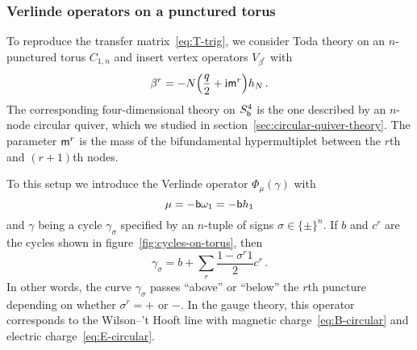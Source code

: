 \subsubsection{Verlinde operators on a punctured torus}

To reproduce the transfer matrix~\eqref{eq:T-trig}, we consider Toda
theory on an $n$-punctured torus $C_{1,n}$ and insert vertex operators
$V_{\beta^r}$ with
\begin{equation}
  \beta^r
  = -N\Bigl(\frac{q}{2} + \mathrm{i}\mathsf{m}^r\Bigr) h_N \,.
\end{equation}
The corresponding four-dimensional theory on $S^4_{\mathsf{b}}$ is the one
described by an $n$-node circular quiver, which we studied in
section~\ref{sec:circular-quiver-theory}.  The parameter $\mathsf{m}^r$ is
the mass of the bifundamental hypermultiplet between the $r$th and
$(r+1)$th nodes.

To this setup we introduce the Verlinde operator $\Phi_\mu(\gamma)$
with
\begin{equation}
  \mu = -\mathsf{b}\omega_1 = -\mathsf{b} h_1
\end{equation}
and $\gamma$ being a cycle $\gamma_\sigma$ specified by an $n$-tuple
of signs $\sigma \in \{\pm\}^n$.  If $b$ and $c^r$ are the cycles
shown in figure~\ref{fig:cycles-on-torus}, then
\begin{equation}
  \gamma_\sigma
  =
  b + \sum_r \frac{1 - \sigma^r1}{2} c^r \,.
\end{equation}
In other words, the curve $\gamma_\sigma$ passes ``above'' or
``below'' the $r$th puncture depending on whether $\sigma^r = +$ or
$-$.  In the gauge theory, this operator corresponds to the Wilson--'t
Hooft line with magnetic charge~\eqref{eq:B-circular} and electric
charge~\eqref{eq:E-circular}.

